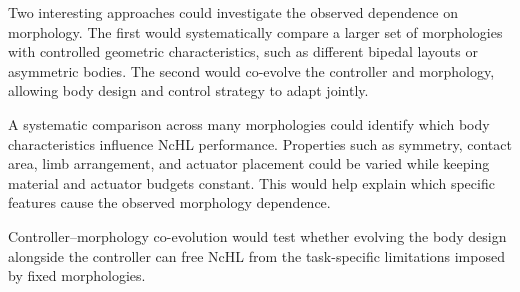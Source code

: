 Two interesting approaches could investigate the observed dependence on morphology. The first would systematically compare a larger set of morphologies with controlled geometric characteristics, such as different bipedal layouts or asymmetric bodies. The second would co-evolve the controller and morphology, allowing body design and control strategy to adapt jointly.

A systematic comparison across many morphologies could identify which body characteristics influence NcHL performance. Properties such as symmetry, contact area, limb arrangement, and actuator placement could be varied while keeping material and actuator budgets constant. This would help explain which specific features cause the observed morphology dependence.

Controller--morphology co-evolution would test whether evolving the body design alongside the controller can free NcHL from the task-specific limitations imposed by fixed morphologies.

